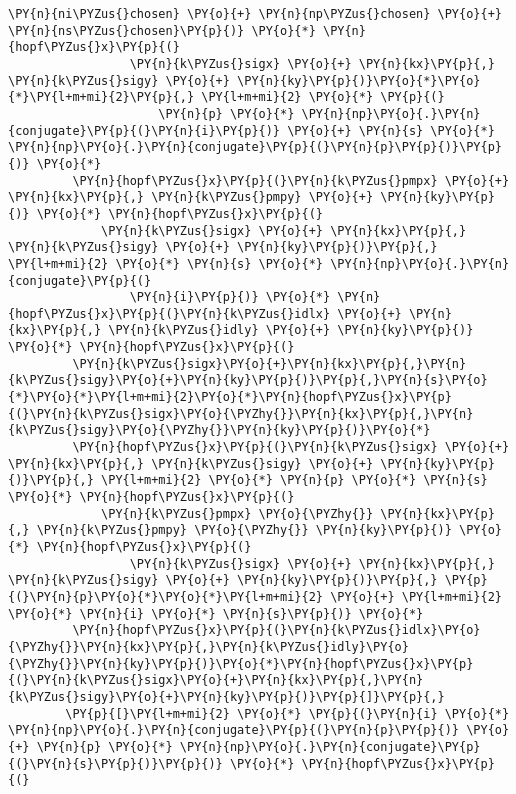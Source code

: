 \begin{Verbatim}[commandchars=\\\{\}]
             \PY{n}{ni\PYZus{}chosen} \PY{o}{+} \PY{n}{np\PYZus{}chosen} \PY{o}{+} \PY{n}{ns\PYZus{}chosen}\PY{p}{)} \PY{o}{*} \PY{n}{hopf\PYZus{}x}\PY{p}{(}
                 \PY{n}{k\PYZus{}sigx} \PY{o}{+} \PY{n}{kx}\PY{p}{,} \PY{n}{k\PYZus{}sigy} \PY{o}{+} \PY{n}{ky}\PY{p}{)}\PY{o}{*}\PY{o}{*}\PY{l+m+mi}{2}\PY{p}{,} \PY{l+m+mi}{2} \PY{o}{*} \PY{p}{(}
                     \PY{n}{p} \PY{o}{*} \PY{n}{np}\PY{o}{.}\PY{n}{conjugate}\PY{p}{(}\PY{n}{i}\PY{p}{)} \PY{o}{+} \PY{n}{s} \PY{o}{*} \PY{n}{np}\PY{o}{.}\PY{n}{conjugate}\PY{p}{(}\PY{n}{p}\PY{p}{)}\PY{p}{)} \PY{o}{*}
         \PY{n}{hopf\PYZus{}x}\PY{p}{(}\PY{n}{k\PYZus{}pmpx} \PY{o}{+} \PY{n}{kx}\PY{p}{,} \PY{n}{k\PYZus{}pmpy} \PY{o}{+} \PY{n}{ky}\PY{p}{)} \PY{o}{*} \PY{n}{hopf\PYZus{}x}\PY{p}{(}
             \PY{n}{k\PYZus{}sigx} \PY{o}{+} \PY{n}{kx}\PY{p}{,} \PY{n}{k\PYZus{}sigy} \PY{o}{+} \PY{n}{ky}\PY{p}{)}\PY{p}{,} \PY{l+m+mi}{2} \PY{o}{*} \PY{n}{s} \PY{o}{*} \PY{n}{np}\PY{o}{.}\PY{n}{conjugate}\PY{p}{(}
                 \PY{n}{i}\PY{p}{)} \PY{o}{*} \PY{n}{hopf\PYZus{}x}\PY{p}{(}\PY{n}{k\PYZus{}idlx} \PY{o}{+} \PY{n}{kx}\PY{p}{,} \PY{n}{k\PYZus{}idly} \PY{o}{+} \PY{n}{ky}\PY{p}{)} \PY{o}{*} \PY{n}{hopf\PYZus{}x}\PY{p}{(}
         \PY{n}{k\PYZus{}sigx}\PY{o}{+}\PY{n}{kx}\PY{p}{,}\PY{n}{k\PYZus{}sigy}\PY{o}{+}\PY{n}{ky}\PY{p}{)}\PY{p}{,}\PY{n}{s}\PY{o}{*}\PY{o}{*}\PY{l+m+mi}{2}\PY{o}{*}\PY{n}{hopf\PYZus{}x}\PY{p}{(}\PY{n}{k\PYZus{}sigx}\PY{o}{\PYZhy{}}\PY{n}{kx}\PY{p}{,}\PY{n}{k\PYZus{}sigy}\PY{o}{\PYZhy{}}\PY{n}{ky}\PY{p}{)}\PY{o}{*}
         \PY{n}{hopf\PYZus{}x}\PY{p}{(}\PY{n}{k\PYZus{}sigx} \PY{o}{+} \PY{n}{kx}\PY{p}{,} \PY{n}{k\PYZus{}sigy} \PY{o}{+} \PY{n}{ky}\PY{p}{)}\PY{p}{,} \PY{l+m+mi}{2} \PY{o}{*} \PY{n}{p} \PY{o}{*} \PY{n}{s} \PY{o}{*} \PY{n}{hopf\PYZus{}x}\PY{p}{(}
             \PY{n}{k\PYZus{}pmpx} \PY{o}{\PYZhy{}} \PY{n}{kx}\PY{p}{,} \PY{n}{k\PYZus{}pmpy} \PY{o}{\PYZhy{}} \PY{n}{ky}\PY{p}{)} \PY{o}{*} \PY{n}{hopf\PYZus{}x}\PY{p}{(}
                 \PY{n}{k\PYZus{}sigx} \PY{o}{+} \PY{n}{kx}\PY{p}{,} \PY{n}{k\PYZus{}sigy} \PY{o}{+} \PY{n}{ky}\PY{p}{)}\PY{p}{,} \PY{p}{(}\PY{n}{p}\PY{o}{*}\PY{o}{*}\PY{l+m+mi}{2} \PY{o}{+} \PY{l+m+mi}{2} \PY{o}{*} \PY{n}{i} \PY{o}{*} \PY{n}{s}\PY{p}{)} \PY{o}{*}
         \PY{n}{hopf\PYZus{}x}\PY{p}{(}\PY{n}{k\PYZus{}idlx}\PY{o}{\PYZhy{}}\PY{n}{kx}\PY{p}{,}\PY{n}{k\PYZus{}idly}\PY{o}{\PYZhy{}}\PY{n}{ky}\PY{p}{)}\PY{o}{*}\PY{n}{hopf\PYZus{}x}\PY{p}{(}\PY{n}{k\PYZus{}sigx}\PY{o}{+}\PY{n}{kx}\PY{p}{,}\PY{n}{k\PYZus{}sigy}\PY{o}{+}\PY{n}{ky}\PY{p}{)}\PY{p}{]}\PY{p}{,}
        \PY{p}{[}\PY{l+m+mi}{2} \PY{o}{*} \PY{p}{(}\PY{n}{i} \PY{o}{*} \PY{n}{np}\PY{o}{.}\PY{n}{conjugate}\PY{p}{(}\PY{n}{p}\PY{p}{)} \PY{o}{+} \PY{n}{p} \PY{o}{*} \PY{n}{np}\PY{o}{.}\PY{n}{conjugate}\PY{p}{(}\PY{n}{s}\PY{p}{)}\PY{p}{)} \PY{o}{*} \PY{n}{hopf\PYZus{}x}\PY{p}{(}

\end{Verbatim}
